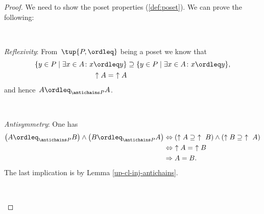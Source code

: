 \begin{proof}
We need to show the poset properties (\cref{def:poset}).
We can prove the following:

\

\begin{compactitem}
\item \emph{Reflexivity}: From~$\tup{P,\ordleq}$ being a poset we know that 
\begin{equation}
\begin{aligned}
\{y\in P \mid \exists x\in A \colon x\ordleq y\} &\supseteq \{y\in P \mid \exists x\in A \colon x\ordleq y\},\\
\uparrow A =\ \uparrow A
\end{aligned}
\end{equation}
and hence~$A\ordleq_{\antichains P}A$.

\

\item \emph{Antisymmetry}: One has
\begin{equation}
    \begin{aligned}
    \left(A\ordleq_{\antichains P} B\right) \wedge \left(B\ordleq_{\antichains P} A\right)
    &\Leftrightarrow \left(\uparrow A \supseteq \ \uparrow \ B\right) \wedge \left( \uparrow  B\supseteq \ \uparrow \ A\right)\\
    &\Leftrightarrow \ \uparrow A= \ \uparrow B \\
    & \Rightarrow A = B.
    \end{aligned}
\end{equation}
The last implication is by Lemma \ref{up-cl-inj-antichains}. 

\



\end{compactitem}
\end{proof}
